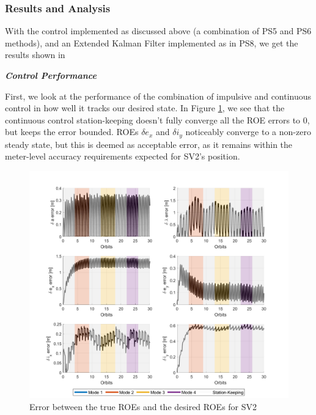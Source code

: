 \subsubsection{Results and Analysis}
With the control implemented as discussed above (a combination of PS5 and PS6 methods), and an Extended Kalman Filter implemented as in PS8, we get the results shown in 

\textbf{\textit{Control Performance}}

First, we look at the performance of the combination of impulsive and continuous control in how well it tracks our desired state. In Figure \ref{fig:roe_error_control_sv2}, we see that the continuous control station-keeping doesn't fully converge all the ROE errors to $0$, but keeps the error bounded. ROEs $\delta e_x$ and $\delta i_y$ noticeably converge to a non-zero steady state, but this is deemed as acceptable error, as it remains within the meter-level accuracy requirements expected for SV2's position.

\begin{figure}[H]
    \centering
    \includegraphics[width=0.7\linewidth]{sim/figures/PS9/ROE_error_over_time_modes_SV2.png}
    \caption{Error between the true ROEs and the desired ROEs for SV2}
    \label{fig:roe_error_control_sv2}
\end{figure}

